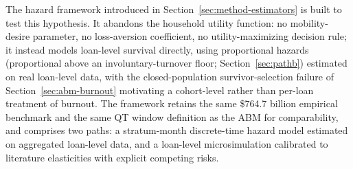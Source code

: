 \documentclass[12pt]{article}
\begin{document}
The hazard framework introduced in Section~\ref{sec:method-estimators} is built to test this hypothesis. It abandons the household utility function: no mobility-desire parameter, no loss-aversion coefficient, no utility-maximizing decision rule; it instead models loan-level survival directly, using proportional hazards (proportional above an involuntary-turnover floor; Section~\ref{sec:pathb}) estimated on real loan-level data, with the closed-population survivor-selection failure of Section~\ref{sec:abm-burnout} motivating a cohort-level rather than per-loan treatment of burnout. The framework retains the same \$764.7 billion empirical benchmark and the same QT window definition as the ABM for comparability, and comprises two paths: a stratum-month discrete-time hazard model estimated on aggregated loan-level data, and a loan-level microsimulation calibrated to literature elasticities with explicit competing risks.
\end{document}
